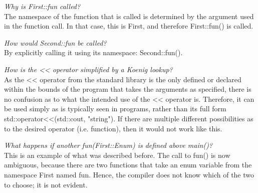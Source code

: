 \textit{Why is First::fun called?} \\
The namespace of the function that is called is determined by the argument used in the function call. In that case, this is First, and therefore First::fun() is called.

\textit{How would Second::fun be called?} \\
By explicitly calling it using its namespace: Second::fun().

\textit{How is the << operator simplified by a Koenig lookup?} \\
As the << operator from the standard library is the only defined or declared within the bounds of the program that takes the arguments as specified, there is no confusion as to what the intended use of the << operator is. Therefore, it can be used simply as is typically seen in programs, rather than its full form std::operator<<(std::cout, "string"). If there are multiple different possibilities as to the desired operator (i.e. function), then it would not work like this.

\textit{What happens if another fun(First::Enum) is defined above main()?} \\
This is an example of what was described before. The call to fun() is now ambiguous, because there are two functions that take an enum variable from the namespace First named fun. Hence, the compiler does not know which of the two to choose; it is not evident.
